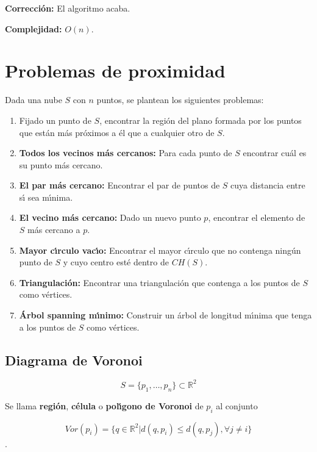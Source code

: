 \documentclass[twoside]{report}
\begin{document}
{\bf Correcci\'{o}n:} El algoritmo acaba.

{\bf Complejidad:} $O(n)$.

\section{Problemas de proximidad}

Dada una nube $S$ con $n$ puntos, se plantean los si\-guien\-tes
problemas:


\begin{enumerate}

  \item Fijado un punto de $S$, encontrar la regi\'{o}n del plano
formada por los puntos que est\'{a}n m\'{a}s pr\'{o}ximos a \'{e}l que a cualquier
otro de $S$.

  \item \textbf{Todos los vecinos m\'{a}s cercanos:} Para cada punto de $S$ encontrar cu\'{a}l es su punto m\'{a}s cercano.

  \item \textbf{El par m\'{a}s cercano:} Encontrar el par de puntos de $S$ cuya distancia entre s\'{\i} sea m\'{\i}nima.

  \item \textbf{El vecino m\'{a}s cercano:} Dado un nuevo punto $p$,
encontrar el elemento de $S$ m\'{a}s cercano a $p$.

  \item \textbf{Mayor c\'{\i}rculo vac\'{\i}o:} Encontrar el mayor c\'{\i}rculo que no contenga ning\'{u}n punto de $S$ y cuyo centro est\'{e} dentro de $CH(S)$.

  \item \textbf{Triangulaci\'{o}n:} Encontrar una triangulaci\'{o}n que contenga a los puntos de $S$ como v\'{e}rtices.

  \item \textbf{\'{A}rbol spanning m\'{\i}nimo:} Construir un \'{a}rbol de longitud m\'{\i}nima que tenga a los puntos de $S$ como v\'{e}rtices.

\end{enumerate}

\subsection{Diagrama de Voronoi}

$$S = \{ p_1, \dots ,p_n \} \subset \mathbb{R}^2$$

\begin{defi}Se llama \textbf{regi\'{o}n}, \textbf{c\'{e}lula} o \textbf{pol\'{\i}gono de Voronoi} de  $p_i$ al conjunto

\vspace{-0.2cm}

$$Vor(p_i)=\{q\in \mathbb{R}^2 | d(q,p_i) \leq d(q,p_j), \forall j \neq i \}$$.

\end{defi}
\end{document}
